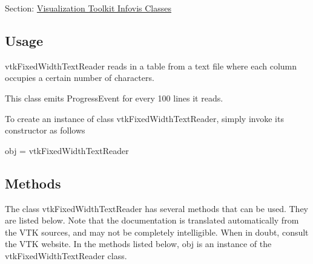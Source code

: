 Section\-: \hyperlink{sec_vtkinfovis}{Visualization Toolkit Infovis Classes} \hypertarget{vtkwidgets_vtkxyplotwidget_Usage}{}\subsection{Usage}\label{vtkwidgets_vtkxyplotwidget_Usage}
vtk\-Fixed\-Width\-Text\-Reader reads in a table from a text file where each column occupies a certain number of characters.

This class emits Progress\-Event for every 100 lines it reads.

To create an instance of class vtk\-Fixed\-Width\-Text\-Reader, simply invoke its constructor as follows \begin{DoxyVerb}  obj = vtkFixedWidthTextReader
\end{DoxyVerb}
 \hypertarget{vtkwidgets_vtkxyplotwidget_Methods}{}\subsection{Methods}\label{vtkwidgets_vtkxyplotwidget_Methods}
The class vtk\-Fixed\-Width\-Text\-Reader has several methods that can be used. They are listed below. Note that the documentation is translated automatically from the V\-T\-K sources, and may not be completely intelligible. When in doubt, consult the V\-T\-K website. In the methods listed below, {\ttfamily obj} is an instance of the vtk\-Fixed\-Width\-Text\-Reader class. 
